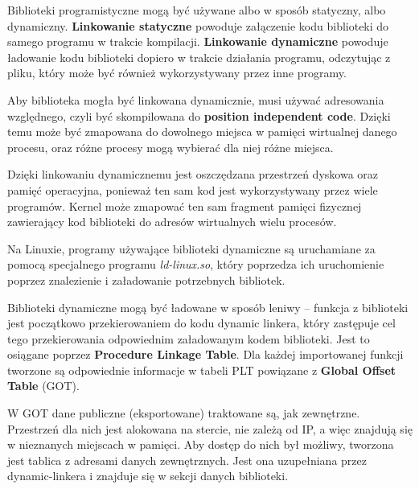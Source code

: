 Biblioteki programistyczne mogą być używane albo w sposób statyczny, albo dynamiczny. \textbf{Linkowanie statyczne} powoduje załączenie kodu biblioteki do samego programu w trakcie kompilacji. \textbf{Linkowanie dynamiczne} powoduje ładowanie kodu biblioteki dopiero w trakcie działania programu, odczytując z pliku, który może być również wykorzystywany przez inne programy.

Aby biblioteka mogła być linkowana dynamicznie, musi używać adresowania względnego, czyli być skompilowana do \textbf{position independent code}. Dzięki temu może być zmapowana do dowolnego miejsca w pamięci wirtualnej danego procesu, oraz różne procesy mogą wybierać dla niej różne miejsca.

Dzięki linkowaniu dynamicznemu jest oszczędzana przestrzeń dyskowa oraz pamięć operacyjna, ponieważ ten sam kod jest wykorzystywany przez wiele programów. Kernel może zmapować ten sam fragment pamięci fizycznej zawierający kod biblioteki do adresów wirtualnych wielu procesów.

Na Linuxie, programy używające biblioteki dynamiczne są uruchamiane za pomocą specjalnego programu \textit{ld-linux.so}, który poprzedza ich uruchomienie poprzez znalezienie i załadowanie potrzebnych bibliotek.

Biblioteki dynamiczne mogą być ładowane w sposób leniwy -- funkcja z biblioteki jest początkowo przekierowaniem do kodu dynamic linkera, który zastępuje cel tego przekierowania odpowiednim załadowanym kodem biblioteki. Jest to osiągane poprzez \textbf{Procedure Linkage Table}. Dla każdej importowanej funkcji tworzone są odpowiednie informacje w tabeli PLT powiązane z \textbf{Global Offset Table} (GOT). 

W GOT dane publiczne (eksportowane) traktowane są, jak zewnętrzne. Przestrzeń dla nich jest alokowana na stercie, nie zależą od IP, a więc znajdują się w nieznanych miejscach w pamięci. Aby dostęp do nich był możliwy, tworzona jest tablica z adresami danych zewnętrznych. Jest ona uzupełniana przez dynamic-linkera i znajduje się w sekcji danych biblioteki.